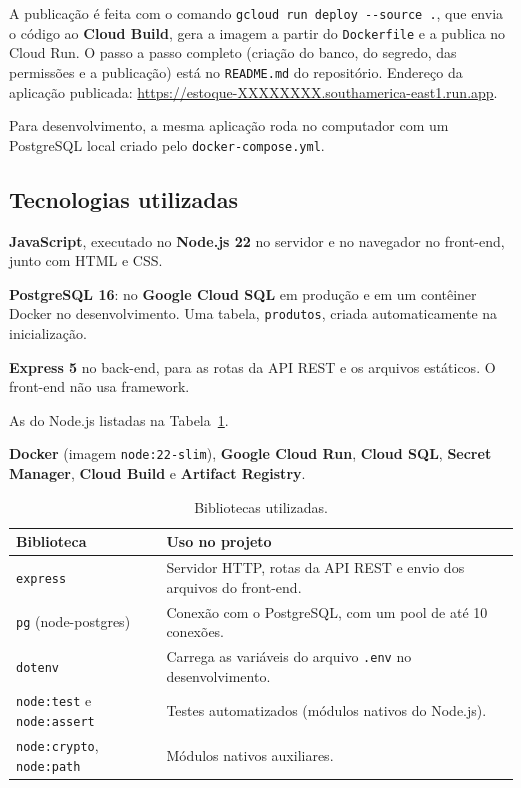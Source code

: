 \documentclass[12pt,a4paper]{article}
\newcommand{\urlaplicacao}{https://estoque-XXXXXXXX.southamerica-east1.run.app}
\newcommand{\arq}[1]{\texttt{#1}}
\begin{document}
A publicação é feita com o comando \texttt{gcloud run deploy -{}-source .}, que envia o código ao
\textbf{Cloud Build}, gera a imagem a partir do \arq{Dockerfile} e a publica no Cloud Run. O
passo a passo completo (criação do banco, do segredo, das permissões e a publicação) está no
\arq{README.md} do repositório. Endereço da aplicação publicada: \url{\urlaplicacao}.

Para desenvolvimento, a mesma aplicação roda no computador com um PostgreSQL local criado pelo
\arq{docker-compose.yml}.

\subsection{Tecnologias utilizadas}

\begin{description}[style=nextline,leftmargin=0.6cm]
  \item[Linguagem de programação] \textbf{JavaScript}, executado no \textbf{Node.js 22} no
        servidor e no navegador no front-end, junto com HTML e CSS.
  \item[Banco de dados] \textbf{PostgreSQL 16}: no \textbf{Google Cloud SQL} em produção e em
        um contêiner Docker no desenvolvimento. Uma tabela, \texttt{produtos}, criada
        automaticamente na inicialização.
  \item[Frameworks] \textbf{Express 5} no back-end, para as rotas da API REST e os arquivos
        estáticos. O front-end não usa framework.
  \item[Bibliotecas] As do Node.js listadas na Tabela~\ref{tab:bibliotecas}.
  \item[Infraestrutura] \textbf{Docker} (imagem \texttt{node:22-slim}), \textbf{Google Cloud
        Run}, \textbf{Cloud SQL}, \textbf{Secret Manager}, \textbf{Cloud Build} e
        \textbf{Artifact Registry}.
\end{description}

\begin{table}[H]
\centering
\small
\caption{Bibliotecas utilizadas.}
\label{tab:bibliotecas}
\begin{tabularx}{\textwidth}{@{}lX@{}}
\toprule
\textbf{Biblioteca} & \textbf{Uso no projeto} \\
\midrule
\texttt{express} & Servidor HTTP, rotas da API REST e envio dos arquivos do front-end. \\
\texttt{pg} (node-postgres) & Conexão com o PostgreSQL, com um pool de até 10 conexões. \\
\texttt{dotenv} & Carrega as variáveis do arquivo \texttt{.env} no desenvolvimento. \\
\texttt{node:test} e \texttt{node:assert} & Testes automatizados (módulos nativos do Node.js). \\
\texttt{node:crypto}, \texttt{node:path} & Módulos nativos auxiliares. \\
\bottomrule
\end{tabularx}
\end{table}
\end{document}
